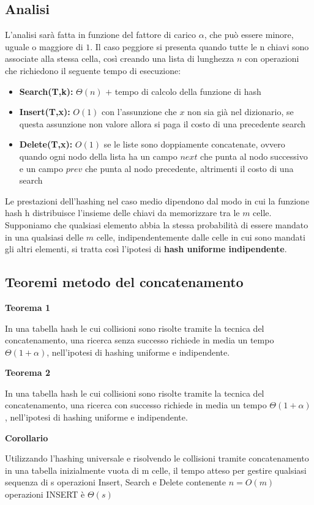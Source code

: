 \subsection{Analisi}
L’analisi sarà fatta in funzione del fattore di carico $\alpha$, che può essere minore, uguale o maggiore
di $1$. Il caso peggiore si presenta quando tutte le n chiavi sono associate alla stessa cella, così
creando una lista di lunghezza $n$ con operazioni che richiedono il seguente tempo di esecuzione:
\begin{itemize}
    \item \textbf{Search(T,k):} \textbf{$\Theta(n)$} $+$ tempo di calcolo della funzione di hash 
    \item \textbf{Insert(T,x):} \textbf{$O(1)$} con l'assunzione che $x$ non sia già nel dizionario, se questa assunzione non valore
    allora si paga il costo di una precedente search
    \item \textbf{Delete(T,x):} \textbf{$O(1)$} se le liste sono doppiamente concatenate, ovvero quando ogni nodo
della lista ha un campo $next$ che punta al nodo successivo e un campo $prev$ che punta al
nodo precedente, altrimenti il costo di una search 
\end{itemize}
\noindent Le prestazioni dell’hashing nel caso medio dipendono dal modo in cui la funzione hash h 
distribuisce l’insieme delle chiavi da memorizzare tra le $m$ celle.\\
Supponiamo che qualsiasi elemento abbia la stessa probabilità di essere mandato in una qualsiasi delle $m$ celle, indipendentemente
dalle celle in cui sono mandati gli altri elementi, si tratta così l’ipotesi di \textbf{hash uniforme indipendente}.
\subsection{Teoremi metodo del concatenamento}
\textbf{Teorema 1}
\begin{theorem}
In una tabella hash le cui collisioni sono risolte tramite la tecnica del concatenamento, una
ricerca senza successo richiede in media un tempo $\Theta(1 + \alpha)$, nell’ipotesi di hashing
uniforme e indipendente.
\end{theorem}
\noindent \textbf{Teorema 2}
\begin{theorem}
In una tabella hash le cui collisioni sono risolte tramite la tecnica del concatenamento, una
ricerca con successo richiede in media un tempo $\Theta(1 + \alpha)$, nell’ipotesi di hashing
uniforme e indipendente.
\end{theorem}
\noindent \textbf{Corollario}
\begin{corollario}
    Utilizzando l'hashing universale e risolvendo le collisioni tramite concatenamento in una 
    tabella inizialmente vuota di m celle, il tempo atteso per gestire qualsiasi sequenza di s 
    operazioni Insert, Search e Delete contenente $n=O(m)$ operazioni INSERT è $\Theta(s)$
\end{corollario}
